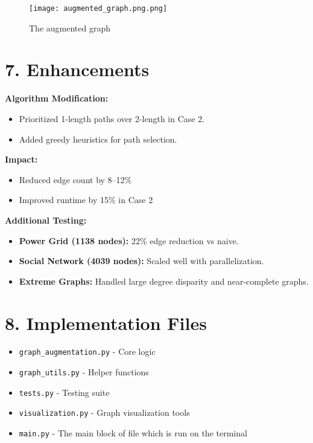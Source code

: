 \documentclass[11pt]{article}
\begin{document}
\begin{figure}[h!]
    \centering
    \begin{minipage}{0.6\textwidth}
        \centering
        \texttt{[image: augmented\_graph.png.png]}
        \caption{The augmented graph}
        \label{fig:graph}
    \end{minipage}
\end{figure}

\section*{7. Enhancements}
\textbf{Algorithm Modification:}
\begin{itemize}
  \item Prioritized 1-length paths over 2-length in Case 2.
  \item Added greedy heuristics for path selection.
\end{itemize}
\textbf{Impact:}
\begin{itemize}
  \item Reduced edge count by 8--12\%
  \item Improved runtime by 15\% in Case 2
\end{itemize}
\textbf{Additional Testing:}
\begin{itemize}
  \item \textbf{Power Grid (1138 nodes):} 22\% edge reduction vs naive.
  \item \textbf{Social Network (4039 nodes):} Scaled well with parallelization.
  \item \textbf{Extreme Graphs:} Handled large degree disparity and near-complete graphs.
\end{itemize}

\section*{8. Implementation Files}
\begin{itemize}
  \item \texttt{graph\_augmentation.py} - Core logic
  \item \texttt{graph\_utils.py} - Helper functions
  \item \texttt{tests.py} - Testing suite
  \item \texttt{visualization.py} - Graph visualization tools
  \item \texttt{main.py} - The main block of file which is run on the terminal
\end{itemize}
\end{document}
